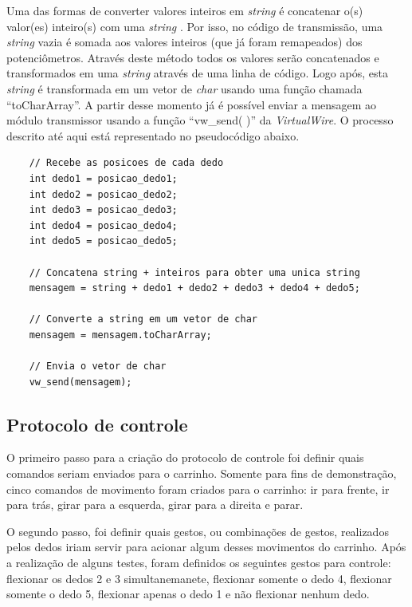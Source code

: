 \documentclass[
	12pt,				%
	openright,			%
	oneside,			%
	a4paper,			%
	english,			%
	brazil				%
	]{abntex2}
\begin{document}
		Uma das formas de converter valores inteiros em \textit{string} é concatenar o(s) valor(es) inteiro(s) com uma \textit{string} \cite{arduinostringadd}. Por isso, no código de transmissão, uma \textit{string} vazia é somada aos valores inteiros (que já foram remapeados) dos potenciômetros. Através deste método todos os valores serão concatenados e transformados em uma \textit{string} através de uma linha de código. Logo após, esta \textit{string} é transformada em um vetor de \textit{char} usando uma função chamada ``toCharArray''. A partir desse momento já é possível enviar a mensagem ao módulo transmissor usando a função ``vw\_send( )'' da \textit{VirtualWire}. O processo descrito até aqui está representado no pseudocódigo abaixo.		
\begin{lstlisting}	
	// Recebe as posicoes de cada dedo
	int dedo1 = posicao_dedo1;
	int dedo2 = posicao_dedo2;
	int dedo3 = posicao_dedo3;
	int dedo4 = posicao_dedo4;
	int dedo5 = posicao_dedo5;

	// Concatena string + inteiros para obter uma unica string
	mensagem = string + dedo1 + dedo2 + dedo3 + dedo4 + dedo5;

	// Converte a string em um vetor de char
	mensagem = mensagem.toCharArray;

	// Envia o vetor de char
	vw_send(mensagem);
\end{lstlisting}

				
		\subsection{Protocolo de controle} \label{sub:protocolo-de-controle}

		O primeiro passo para a criação do protocolo de controle foi definir quais comandos seriam enviados para o carrinho. Somente para fins de demonstração, cinco comandos de movimento foram criados para o carrinho: ir para frente, ir para trás, girar para a esquerda, girar para a direita e parar.

		O segundo passo, foi definir quais gestos, ou combinações de gestos, realizados pelos dedos iriam servir para acionar algum desses movimentos do carrinho. Após a realização de alguns testes, foram definidos os seguintes gestos para controle: flexionar os dedos 2 e 3 simultanemanete, flexionar somente o dedo 4, flexionar somente o dedo 5, flexionar apenas o dedo 1 e não flexionar nenhum dedo.
\end{document}
